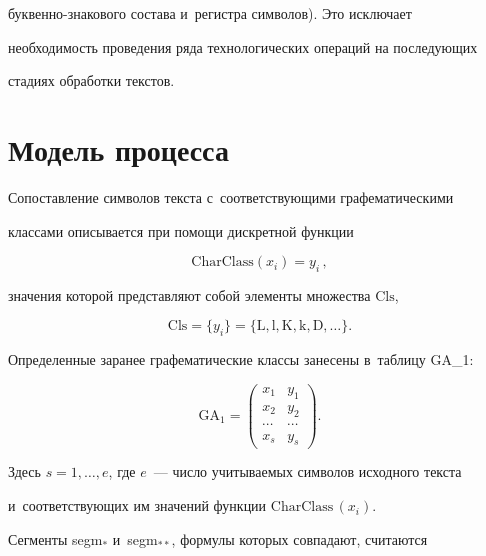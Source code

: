 бук\-вен\-но-зна\-ко\-во\-го состава и~регистра символов). Это исключает 


необходимость проведения ряда технологических операций на последующих 


стадиях обработки текстов. 





\section{Модель процесса}


  


  Сопоставление символов текста с~соответствующими графематическими 


классами описывается при помощи дискретной функции


  $$


  \mathrm{CharClass}\left( x_i\right)=y_i\,,


  $$


значения которой представляют собой элементы множества $\mathrm{Cls}$,


$$


\mathrm{Cls}= \{ y_i\}=\{\mathrm{L,l,K,k,D},\ldots\}.


$$


  


  Определенные заранее графематические классы занесены в~таблицу GA\_1:


  $$


  \mathrm{GA_1}= \begin{pmatrix}


  x_1 & y_1\\


  x_2 & y_2\\


  \cdots &\cdots\\


  x_s& y_s


  \end{pmatrix}.


  $$


Здесь $s=1,\ldots , e$, где $e$~--- число учитываемых символов исходного текста 


и~соответствующих им значений функции $\mathrm{CharClass}\,(x_i)$. 


  


  Сегменты segm$_*$ и~segm$_{**}$, формулы которых совпадают, считаются 


